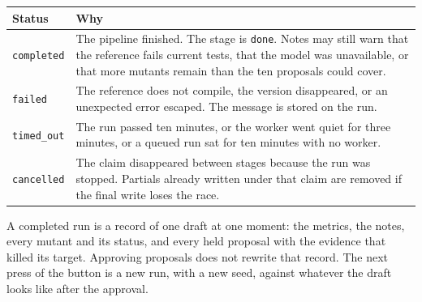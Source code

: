 \documentclass[10pt,a4paper]{article}
\begin{document}
\needspace{4.6cm}
\begin{center}
\small
\begin{tabularx}{\textwidth}{@{}l Y@{}}
\toprule
\textbf{Status} & \textbf{Why} \\
\midrule
\texttt{completed} & The pipeline finished. The stage is \texttt{done}. Notes may still warn that the reference fails current tests, that the model was unavailable, or that more mutants remain than the ten proposals could cover. \\
\texttt{failed} & The reference does not compile, the version disappeared, or an unexpected error escaped. The message is stored on the run. \\
\texttt{timed\_out} & The run passed ten minutes, or the worker went quiet for three minutes, or a queued run sat for ten minutes with no worker. \\
\texttt{cancelled} & The claim disappeared between stages because the run was stopped. Partials already written under that claim are removed if the final write loses the race. \\
\bottomrule
\end{tabularx}
\end{center}

A completed run is a record of one draft at one moment: the metrics, the notes, every mutant and its status, and every held proposal with the evidence that killed its target. Approving proposals does not rewrite that record. The next press of the button is a new run, with a new seed, against whatever the draft looks like after the approval.
\end{document}
